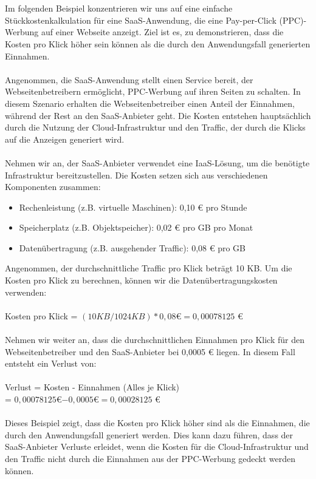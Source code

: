 \\\\
Im folgenden Beispiel konzentrieren wir uns auf eine einfache Stückkostenkalkulation für eine SaaS-Anwendung, die eine Pay-per-Click (PPC)-Werbung auf einer Webseite anzeigt. Ziel ist es, zu demonstrieren, dass die Kosten pro Klick höher sein können als die durch den Anwendungsfall generierten Einnahmen.
\\\\
Angenommen, die SaaS-Anwendung stellt einen Service bereit, der Webseitenbetreibern ermöglicht, PPC-Werbung auf ihren Seiten zu schalten. In diesem Szenario erhalten die Webseitenbetreiber einen Anteil der Einnahmen, während der Rest an den SaaS-Anbieter geht. Die Kosten entstehen hauptsächlich durch die Nutzung der Cloud-Infrastruktur und den Traffic, der durch die Klicks auf die Anzeigen generiert wird.
\\\\
Nehmen wir an, der SaaS-Anbieter verwendet eine IaaS-Lösung, um die benötigte Infrastruktur bereitzustellen. Die Kosten setzen sich aus verschiedenen Komponenten zusammen:
\begin{itemize}
\item Rechenleistung (z.B. virtuelle Maschinen): 0,10 € pro Stunde
\item Speicherplatz (z.B. Objektspeicher): 0,02 € pro GB pro Monat
\item Datenübertragung (z.B. ausgehender Traffic): 0,08 € pro GB
\end{itemize}
Angenommen, der durchschnittliche Traffic pro Klick beträgt 10 KB. Um die Kosten pro Klick zu berechnen, können wir die Datenübertragungskosten verwenden:
\\\\
Kosten pro Klick = $(10 KB / 1024 KB) * 0,08 $€$ = 0,00078125$ €
\\\\
Nehmen wir weiter an, dass die durchschnittlichen Einnahmen pro Klick für den Webseitenbetreiber und den SaaS-Anbieter bei 0,0005 € liegen. In diesem Fall entsteht ein Verlust von:
\\\\
Verlust = Kosten - Einnahmen (Alles je Klick) \\
= $0,00078125 $€$ - 0,0005 $€$ = 0,00028125$ €
\\\\
Dieses Beispiel zeigt, dass die Kosten pro Klick höher sind als die Einnahmen, die durch den Anwendungsfall generiert werden. Dies kann dazu führen, dass der SaaS-Anbieter Verluste erleidet, wenn die Kosten für die Cloud-Infrastruktur und den Traffic nicht durch die Einnahmen aus der PPC-Werbung gedeckt werden können.
